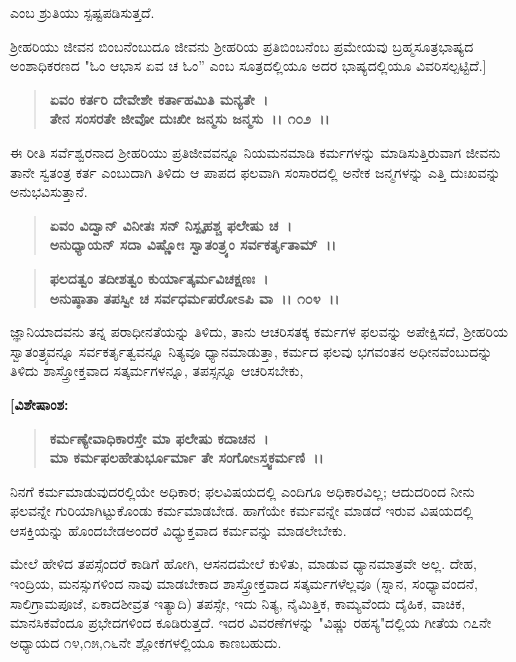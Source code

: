 \noindent
ಎಂಬ ಶ್ರುತಿಯು ಸ್ಪಷ್ಟಪಡಿಸುತ್ತದೆ.

ಶ‍್ರೀಹರಿಯು ಜೀವನ ಬಿಂಬನೆಂಬುದೂ ಜೀವನು ಶ‍್ರೀಹರಿಯ ಪ್ರತಿಬಿಂಬನೆಂಬ ಪ್ರಮೇಯವು ಬ್ರಹ್ಮಸೂತ್ರಭಾಷ್ಯದ ಅಂಶಾಧಿಕರಣದ "ಓಂ ಆಭಾಸ ಏವ ಚ ಓಂ” ಎಂಬ ಸೂತ್ರದಲ್ಲಿಯೂ ಅದರ ಭಾಷ್ಯದಲ್ಲಿಯೂ ವಿವರಿಸಲ್ಪಟ್ಟಿದೆ.]

\begin{verse}
\textbf{ಏವಂ ಕರ್ತರಿ ದೇವೇಶೇ ಕರ್ತಾಹಮಿತಿ ಮನ್ಯತೇ~।}\\\textbf{ತೇನ ಸಂಸರತೇ ಜೀವೋ ದುಃಖೀ ಜನ್ಮಸು ಜನ್ಮಸು~।। ೧೦೨~।।}
\end{verse}

ಈ ರೀತಿ ಸರ್ವೆಶ್ವರನಾದ ಶ‍್ರೀಹರಿಯು ಪ್ರತಿಜೀವವನ್ನೂ ನಿಯಮನಮಾಡಿ ಕರ್ಮಗಳನ್ನು ಮಾಡಿಸುತ್ತಿರುವಾಗ ಜೀವನು ತಾನೇ ಸ್ವತಂತ್ರ ಕರ್ತ ಎಂಬುದಾಗಿ ತಿಳಿದು ಆ ಪಾಪದ ಫಲವಾಗಿ ಸಂಸಾರದಲ್ಲಿ ಅನೇಕ ಜನ್ಮಗಳನ್ನು ಎತ್ತಿ ದುಃಖವನ್ನು ಅನುಭವಿಸುತ್ತಾನೆ.

\begin{verse}
\textbf{ಏವಂ ವಿದ್ವಾನ್ ವಿನೀತಃ ಸನ್ ನಿಸ್ಪೃಹಶ್ಚ ಫಲೇಷು ಚ~।}\\\textbf{ಅನುಧ್ಯಾಯನ್ ಸದಾ ವಿಷ್ಣೋಃ ಸ್ವಾತಂತ್ರ್ಯಂ ಸರ್ವಕರ್ತೃತಾಮ್~।। }
\end{verse}

\begin{verse}
\textbf{ಫಲದತ್ವಂ ತದೀಶತ್ವಂ ಕುರ್ಯಾತ್ಕರ್ಮವಿಚಕ್ಷಣಃ~।}\\\textbf{ಅನುಷ್ಠಾತಾ ತಪಸ್ವೀ ಚ ಸರ್ವಧರ್ಮಪರೋಽಪಿ ವಾ~।। ೧೦೪~।।}
\end{verse}

ಜ್ಞಾನಿಯಾದವನು ತನ್ನ ಪರಾಧೀನತೆಯನ್ನು ತಿಳಿದು, ತಾನು ಆಚರಿಸತಕ್ಕ ಕರ್ಮಗಳ ಫಲವನ್ನು ಅಪೇಕ್ಷಿಸದೆ, ಶ‍್ರೀಹರಿಯ ಸ್ವಾತಂತ್ರ್ಯವನ್ನೂ ಸರ್ವಕರ್ತೃತ್ವವನ್ನೂ ನಿತ್ಯವೂ ಧ್ಯಾನಮಾಡುತ್ತಾ, ಕರ್ಮದ ಫಲವು ಭಗವಂತನ ಅಧೀನವೆಂಬುದನ್ನು ತಿಳಿದು ಶಾಸ್ತ್ರೋಕ್ತವಾದ ಸತ್ಕರ್ಮಗಳನ್ನೂ, ತಪಸ್ಸನ್ನೂ ಆಚರಿಸಬೇಕು,

\begin{flushleft}
\textbf{[ವಿಶೇಷಾಂಶ:}
\end{flushleft}

\begin{verse}
\textbf{ಕರ್ಮಣ್ಯೇವಾಧಿಕಾರಸ್ತೇ ಮಾ ಫಲೇಷು ಕದಾಚನ~।}\\\textbf{ಮಾ ಕರ್ಮಫಲಹೇತುರ್ಭೂರ್ಮಾ ತೇ ಸಂಗೋsಸ್ತ್ವಕರ್ಮಣಿ~।।} 
\end{verse}

ನಿನಗೆ ಕರ್ಮಮಾಡುವುದರಲ್ಲಿಯೇ ಅಧಿಕಾರ; ಫಲವಿಷಯದಲ್ಲಿ ಎಂದಿಗೂ ಅಧಿಕಾರವಿಲ್ಲ; ಆದುದರಿಂದ ನೀನು ಫಲವನ್ನೇ ಗುರಿಯಾಗಿಟ್ಟುಕೊಂಡು ಕರ್ಮಮಾಡಬೇಡ. ಹಾಗೆಯೇ ಕರ್ಮವನ್ನೇ ಮಾಡದೆ ಇರುವ ವಿಷಯದಲ್ಲಿ ಆಸಕ್ತಿಯನ್ನು ಹೊಂದಬೇಡ\enginline{-}ಅಂದರೆ ವಿಧ್ಯುಕ್ತವಾದ ಕರ್ಮವನ್ನು ಮಾಡಲೇಬೇಕು.

ಮೇಲೆ ಹೇಳಿದ ತಪಸ್ಸೆಂದರೆ ಕಾಡಿಗೆ ಹೋಗಿ, ಆಸನದಮೇಲೆ ಕುಳಿತು, ಮಾಡುವ ಧ್ಯಾನಮಾತ್ರವೇ ಅಲ್ಲ. ದೇಹ, ಇಂದ್ರಿಯ, ಮನಸ್ಸುಗಳಿಂದ ನಾವು ಮಾಡಬೇಕಾದ ಶಾಸ್ತ್ರೋಕ್ತವಾದ ಸತ್ಕರ್ಮಗಳೆಲ್ಲವೂ (ಸ್ನಾನ, ಸಂಧ್ಯಾವಂದನೆ, ಸಾಲಿಗ್ರಾಮಪೂಜೆ, ಏಕಾದಶೀವ್ರತ ಇತ್ಯಾದಿ) ತಪಸ್ಸೇ, ಇದು ನಿತ್ಯ, ನೈಮಿತ್ತಿಕ, ಕಾಮ್ಯವೆಂದು ದೈಹಿಕ, ವಾಚಿಕ, ಮಾನಸಿಕವೆಂದೂ ಪ್ರಭೇದಗಳಿಂದ ಕೂಡಿರುತ್ತದೆ. ಇದರ ವಿವರಣೆಗಳನ್ನು "ವಿಷ್ಣು ರಹಸ್ಯ"ದಲ್ಲಿಯ ಗೀತೆಯ ೧೭ನೇ ಅಧ್ಯಾಯದ ೧೪,೧೫,೧೬ನೇ ಶ್ಲೋಕಗಳಲ್ಲಿಯೂ ಕಾಣಬಹುದು.

